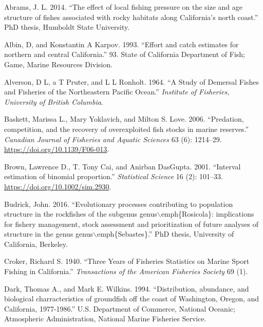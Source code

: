 \documentclass[
  english,
  a4paper,
]{article}
\newlength{\cslhangindent}
\newlength{\cslentryspacingunit} %
\newenvironment{CSLReferences}[2] %
 {%
  \setlength{\parindent}{0pt}
  \ifodd #1
  \let\oldpar\par
  \def\par{\hangindent=\cslhangindent\oldpar}
  \fi
  \setlength{\parskip}{#2\cslentryspacingunit}
 }%
 {}
\begin{document}
\hypertarget{refs}{}
\begin{CSLReferences}{1}{0}
\leavevmode{}%
Abrams, J. L. 2014. {``{The effect of local fishing pressure on the size and age structure of fishes associated with rocky habitats along California's north coast}.''} PhD thesis, Humboldt State University.

\leavevmode{}%
Albin, D, and Konstantin A Karpov. 1993. {``{Effort and catch estimates for northern and central California}.''} 93. State of California Department of Fish; Game, Marine Resources Division.

\leavevmode{}%
Alverson, D L, a T Pruter, and L L Ronholt. 1964. {``{A Study of Demersal Fishes and Fisheries of the Northeastern Pacific Ocean}.''} \emph{Institute of Fisheries, University of British Columbia}.

\leavevmode{}%
Baskett, Marissa L., Mary Yoklavich, and Milton S. Love. 2006. {``{Predation, competition, and the recovery of overexploited fish stocks in marine reserves}.''} \emph{Canadian Journal of Fisheries and Aquatic Sciences} 63 (6): 1214--29. \url{https://doi.org/10.1139/F06-013}.

\leavevmode{}%
Brown, Lawrence D., T. Tony Cai, and Anirban DasGupta. 2001. {``{Interval estimation of binomial proportion}.''} \emph{Statistical Science} 16 (2): 101--33. \url{https://doi.org/10.1002/sim.2930}.

\leavevmode{}%
Budrick, John. 2016. {``{Evolutionary processes contributing to population structure in the rockfishes of the subgenus genus\(\backslash\)emph{\{}Rosicola{\}}: implications for fishery management, stock assessment and prioritization of future analyses of structure in the genus genus\(\backslash\)emph{\{}Sebastes{\}}.}''} PhD thesis, University of California, Berkeley.

\leavevmode{}%
Croker, Richard S. 1940. {``{Three Years of Fisheries Statistics on Marine Sport Fishing in California}.''} \emph{Transactions of the American Fisheries Society} 69 (1).

\leavevmode{}%
Dark, Thomas A., and Mark E. Wilkins. 1994. {``{Distribution, abundance, and biological charracteristics of groundfish off the coast of Washington, Oregon, and California, 1977-1986}.''} U.S. Department of Commerce, National Oceanic; Atmospheric Administration, National Marine Fisheries Service.


\end{CSLReferences}
\end{document}
